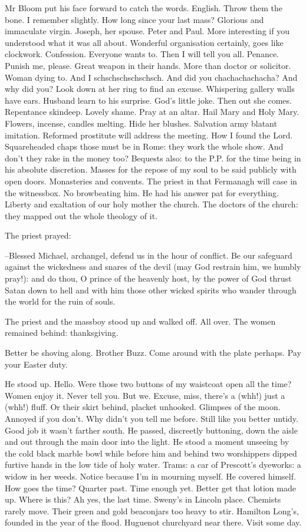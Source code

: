 Mr Bloom put his face forward to catch the words.
English.
Throw them the bone.
I remember slightly.
How long since your last mass?
Glorious and immaculate virgin.
Joseph, her spouse.
Peter and Paul.
More interesting if you understood what it was all about.
Wonderful organisation certainly,
goes like clockwork.
Confession.
Everyone wants to.
Then I will tell you all.
Penance.
Punish me, please.
Great weapon in their hands.
More than doctor or solicitor.
Woman dying to.
And I schschschschschsch.
And did you chachachachacha?
And why did you?
Look down at her ring to find an excuse.
Whispering gallery walls have ears.
Husband learn to his surprise.
God's little joke.
Then out she comes.
Repentance skindeep.
Lovely shame.
Pray at an altar.
Hail Mary and Holy Mary.
Flowers, incense, candles melting.
Hide her blushes.
Salvation army blatant imitation.
Reformed prostitute will address the meeting.
How I found the Lord.
Squareheaded chaps those must be in Rome:
they work the whole show.
And don't they rake in the money too?
Bequests also:
to the P.P. for the time being in his absolute discretion.
Masses for the repose of my soul to be said publicly with open doors.
Monasteries and convents.
The priest in that Fermanagh will case in the witnessbox.
No browbeating him.
He had his answer pat for everything.
Liberty and exaltation of our holy mother the church.
The doctors of the church:
they mapped out the whole theology of it.

The priest prayed:

--Blessed Michael,
archangel,
defend us in the hour of conflict.
Be our safeguard against the wickedness and snares of the devil
(may God restrain him, we humbly pray!):
and do thou,
O prince of the heavenly host,
by the power of God
thrust Satan down to hell and with him
those other wicked spirits who wander through the world
for the ruin of souls.

The priest and the massboy stood up and walked off.
All over.
The women remained behind:
thanksgiving.

Better be shoving along.
Brother Buzz.
Come around with the plate perhaps.
Pay your Easter duty.

He stood up.
Hello.
Were those two buttons of my waistcoat open all the time?
Women enjoy it.
Never tell you.
But we.
Excuse, miss, there's a (whh!)
just a (whh!) fluff.
Or their skirt behind, placket unhooked.
Glimpses of the moon.
Annoyed if you don't.
Why didn't you tell me before.
Still like you better untidy.
Good job it wasn't farther south.
He passed, discreetly buttoning,
down the aisle and out through the main door into the light.
He stood a moment unseeing
by the cold black marble bowl
while before him and behind
two worshippers dipped furtive hands in the low tide of holy water.
Trams:
a car of Prescott's dyeworks:
a widow in her  weeds.
Notice because I'm in mourning myself.
He covered himself.
How goes the time?
Quarter past.
Time enough yet.
Better get that lotion made up.
Where is this?
Ah yes, the last time.
Sweny's in Lincoln place.
Chemists rarely move.
Their green and gold beaconjars too heavy to stir.
Hamilton Long's, founded in the year of the flood.
Huguenot churchyard near there.
Visit some day.

